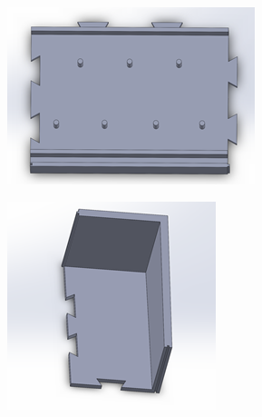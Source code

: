 \begin{figure}[h!]
\begin{subfigure}[b]{0.45\textwidth}
  \end{subfigure}
  \begin{subfigure}[b]{0.45\textwidth}
    \centering
    \includegraphics[width=\textwidth]{image/BodyModel6.png}
  \end{subfigure}
  \begin{subfigure}[b]{0.45\textwidth}
    \centering
    \includegraphics[width=\textwidth]{image/BodyModel7.png}
  \end{subfigure}
  \begin{subfigure}[b]{0.45\textwidth}

\end{subfigure}
\end{figure}
